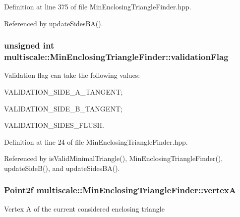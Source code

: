 Definition at line 375 of file Min\-Enclosing\-Triangle\-Finder.\-hpp.



Referenced by update\-Sides\-B\-A().

\hypertarget{classmultiscale_1_1MinEnclosingTriangleFinder_a19f9149638eddeec22b775eef632c6ef}{
\subsubsection[{validation\-Flag}]{\setlength{\rightskip}{0pt plus 5cm}unsigned int multiscale\-::\-Min\-Enclosing\-Triangle\-Finder\-::validation\-Flag\hspace{0.3cm}{\ttfamily [private]}}}\label{classmultiscale_1_1MinEnclosingTriangleFinder_a19f9149638eddeec22b775eef632c6ef}
Validation flag can take the following values\-:
\begin{DoxyItemize}
\item V\-A\-L\-I\-D\-A\-T\-I\-O\-N\-\_\-\-S\-I\-D\-E\-\_\-\-A\-\_\-\-T\-A\-N\-G\-E\-N\-T;
\item V\-A\-L\-I\-D\-A\-T\-I\-O\-N\-\_\-\-S\-I\-D\-E\-\_\-\-B\-\_\-\-T\-A\-N\-G\-E\-N\-T;
\item V\-A\-L\-I\-D\-A\-T\-I\-O\-N\-\_\-\-S\-I\-D\-E\-S\-\_\-\-F\-L\-U\-S\-H. 
\end{DoxyItemize}

Definition at line 24 of file Min\-Enclosing\-Triangle\-Finder.\-hpp.



Referenced by is\-Valid\-Minimal\-Triangle(), Min\-Enclosing\-Triangle\-Finder(), update\-Side\-B(), and update\-Sides\-B\-A().

\hypertarget{classmultiscale_1_1MinEnclosingTriangleFinder_adb758ed8b7e8758436d9f1bb381e017e}{
\subsubsection[{vertex\-A}]{\setlength{\rightskip}{0pt plus 5cm}Point2f multiscale\-::\-Min\-Enclosing\-Triangle\-Finder\-::vertex\-A\hspace{0.3cm}{\ttfamily [private]}}}\label{classmultiscale_1_1MinEnclosingTriangleFinder_adb758ed8b7e8758436d9f1bb381e017e}
Vertex A of the current considered enclosing triangle 

